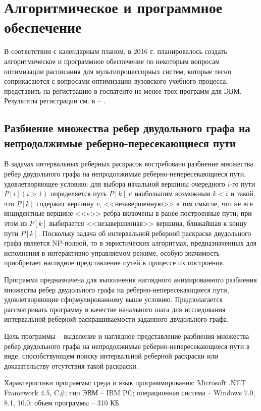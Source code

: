 \chapter{Алгоритмическое и программное обеспечение}\label{akm3}
В соответствии с календарным планом, в 2016 г. планировалось создать алгоритмическое и программное обеспечение по некоторым вопросам оптимизации расписания для мультипроцессорных систем, которые тесно соприкасаются с вопросами оптимизации вузовского учебного процесса, представить на регистрацию в госпатенте не менее трех программ для ЭВМ. Результаты регистрации см. в \cite{akm-prog0} -- \cite{akm-prog5}.
\section{Разбиение множества ребер двудольного графа на непродолжимые реберно-пересекающиеся пути}

В задачах интервальных реберных раскрасок востребовано разбиение множества ребер двудольного графа на непродолжимые реберно-непересекающиеся пути, удовлетворяющее условию: для выбора начальной вершины очередного $i$-го пути $P[i] (i>1)$ определяется путь $P[k]$ с наибольшим возможным $k<i$ и такой, что $P[k]$ содержит вершину $v$, <<незавершенную>> в том смысле, что не все инцидентные вершине
<<v>> ребра включены в ранее построенные пути; при этом из $P[k]$ выбирается <<незавершенная>> вершина, ближайшая к концу пути $P[k]$. Поскольку задача об интервальной реберной раскраске двудольного графа является NP-полной, то в эвристических алгоритмах, предназначенных для исполнения в интерактивно-управляемом режиме, особую значимость приобретает наглядное представление путей в процессе их построения.

 Программа \cite{akm-prog1} предназначена для выполнения наглядного анимированного разбиения множества ребер двудольного графа на реберно-непересекающиеся пути, удовлетворяющие сформулированному выше условию. Предполагается рассматривать программу в качестве начального шага для исследования интервальной реберной раскрашиваемости заданного двудольного графа.

Цель программы – выделение и наглядное представление разбиения множества ребер двудольного графа на непродолжимые реберно-непересекающиеся пути в виде, способствующем поиску интервальной реберной раскраски или доказательству отсутствия такой раскраски.

Характеристики программы:
среда и язык программирования: Microsoft .NET Framework 4.5, C\#;
тип ЭВМ – IBM PC;
операционная система – Windows 7.0, 8.1, 10.0;
объем программы – 310 КБ.

